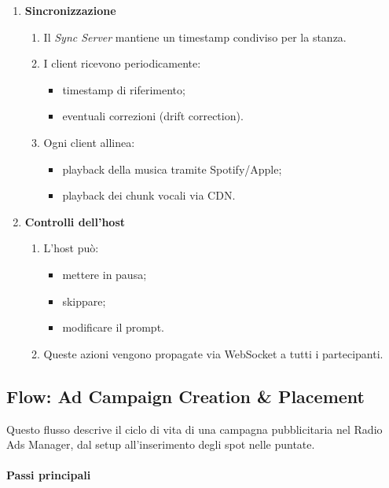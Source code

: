 \documentclass[11pt,a4paper]{article}
\begin{document}
\begin{enumerate}
    \item \textbf{Sincronizzazione}
    \begin{enumerate}
        \item Il \textit{Sync Server} mantiene un timestamp condiviso per la stanza.
        \item I client ricevono periodicamente:
        \begin{itemize}
            \item timestamp di riferimento;
            \item eventuali correzioni (drift correction).
        \end{itemize}
        \item Ogni client allinea:
        \begin{itemize}
            \item playback della musica tramite Spotify/Apple;
            \item playback dei chunk vocali via CDN.
        \end{itemize}
    \end{enumerate}

    \item \textbf{Controlli dell’host}
    \begin{enumerate}
        \item L'host può:
        \begin{itemize}
            \item mettere in pausa;
            \item skippare;
            \item modificare il prompt.
        \end{itemize}
        \item Queste azioni vengono propagate via WebSocket a tutti i partecipanti.
    \end{enumerate}
\end{enumerate}


\subsection{Flow: Ad Campaign Creation \& Placement}

Questo flusso descrive il ciclo di vita di una campagna pubblicitaria nel Radio Ads Manager, dal setup all’inserimento degli spot nelle puntate.

\paragraph{Passi principali}
\end{document}

